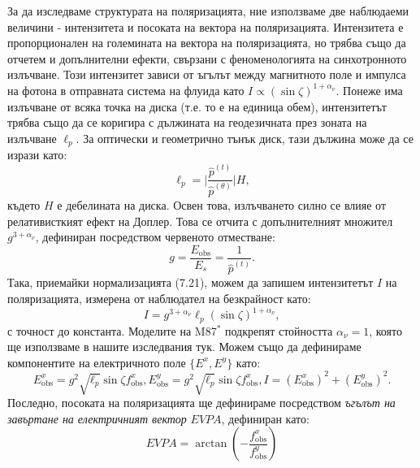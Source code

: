 За да изследваме структурата на поляризацията, ние използваме две наблюдаеми величини - интензитета и посоката на вектора на поляризацията. Интензитета е пропорционален на големината на вектора на поляризацията, но трябва също да отчетем и допълнителни ефекти, свързани с феноменологията на синхотронното излъчване. Този интензитет зависи от ъгълът между магнитното поле и импулса на фотона в отправната система на флуида като $I\propto(\sin\zeta)^{1 + \alpha_\nu}$. Понеже има излъчване от всяка точка на диска (т.е. то е на единица обем), интензитетът трябва също да се коригира с дължината на геодезичната през зоната на излъчване $\ell_p$. За оптически и геометрично тънък диск, тази дължина може да се изрази като:
\begin{equation}
	\ell_p = \bigg\vert\frac{\hat{p}^{(t)}}{\hat{p}^{(\theta)}}\bigg\vert H,
\end{equation}
където $H$ е дебелината на диска. Освен това, излъчването силно се влияе от релативисткият ефект на Доплер. Това се отчита с допълнителният множител $g^{3 + \alpha_\nu}$, дефиниран посредством червеното отместване:
\begin{equation}
	g = \frac{E_\text{obs}}{E_s} = \frac{1}{\hat{p}^{(t)}}.
\end{equation}
Така, приемайки нормализацията (7.21), можем да запишем интензитетът $I$ на поляризацията, измерена от наблюдател на безкрайност като:
\begin{equation}
	I = g^{3 + \alpha_\nu}\ell_p(\sin\zeta)^{1 + \alpha_\nu},
\end{equation}
с точност до константа. Моделите на M87$^*$ подкрепят стойността $\alpha_\nu = 1$, която ще използваме в нашите изследвания тук. Можем също да дефинираме компонентите на електричното поле $\{E^x, E^y\}$ като:
\begin{subequations}
	\begin{equation}
		E^x_{\text{obs}} = g^2\sqrt{\ell_p}\sin\zeta f^x_\text{obs},
	\end{equation}
	\begin{equation}
		E^y_\text{obs} = g^2\sqrt{\ell_p}\sin\zeta f^x_\text{obs},
	\end{equation}
	\begin{equation}
		I = (E^x_\text{obs})^2 + (E^y_\text{obs})^2.
	\end{equation}
\end{subequations}
Последно, посоката на поляризацията ще дефинираме посредством \emph{ъгълът на завъртане на електричният вектор} $EVPA$, дефиниран като:
\begin{equation}
	EVPA = \arctan\left(-\frac{f^x_\text{obs}}{f^y_\text{obs}}\right)
\end{equation}

